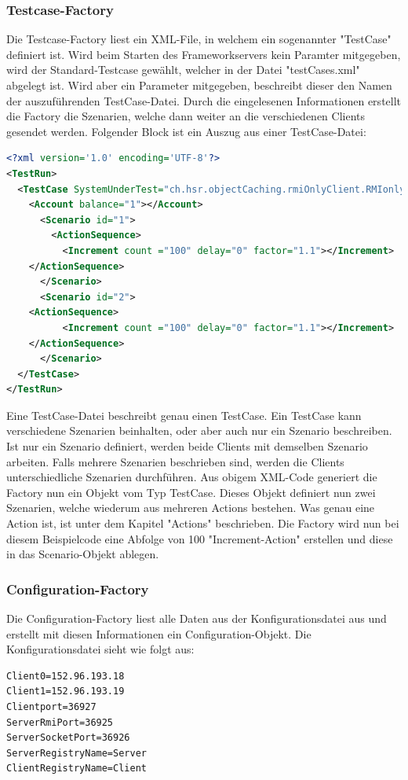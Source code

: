 \subsubsection{Testcase-Factory}
\label{sec:testCaseFactory}
Die Testcase-Factory liest ein XML-File, in welchem ein sogenannter "TestCase" definiert ist. Wird beim Starten des Frameworkservers kein Paramter mitgegeben, wird der Standard-Testcase gewählt, welcher in der Datei "testCases.xml" abgelegt ist. Wird aber ein Parameter mitgegeben, beschreibt dieser den Namen der auszuführenden TestCase-Datei.\newline
Durch die eingelesenen Informationen erstellt die Factory die Szenarien, welche dann weiter an die verschiedenen Clients gesendet werden. Folgender Block ist ein Auszug aus einer TestCase-Datei:

\begin{lstlisting}[language=XML, breaklines=true] 	
<?xml version='1.0' encoding='UTF-8'?>
<TestRun>
  <TestCase SystemUnderTest="ch.hsr.objectCaching.rmiOnlyClient.RMIonlyClientSystem">
    <Account balance="1"></Account>
      <Scenario id="1">
        <ActionSequence>
          <Increment count ="100" delay="0" factor="1.1"></Increment>
	</ActionSequence>
      </Scenario>
      <Scenario id="2">
	<ActionSequence>
          <Increment count ="100" delay="0" factor="1.1"></Increment>
	</ActionSequence>
      </Scenario>
  </TestCase>
</TestRun>
\end{lstlisting}

Eine TestCase-Datei beschreibt genau einen TestCase. Ein TestCase kann verschiedene Szenarien beinhalten, oder aber auch nur ein Szenario beschreiben. Ist nur ein Szenario definiert, werden beide Clients mit demselben Szenario arbeiten. Falls mehrere Szenarien beschrieben sind, werden die Clients unterschiedliche Szenarien durchführen. \newline
Aus obigem XML-Code generiert die Factory nun ein Objekt vom Typ TestCase. Dieses Objekt definiert nun zwei Szenarien, welche wiederum aus mehreren Actions bestehen. Was genau eine Action ist, ist unter dem Kapitel "Actions" beschrieben. Die Factory wird nun bei diesem Beispielcode eine Abfolge von 100 "Increment-Action" erstellen und diese in das Scenario-Objekt ablegen.


\subsubsection{Configuration-Factory}
\label{sec:configurationFactory}
Die Configuration-Factory liest alle Daten aus der Konfigurationsdatei aus und erstellt mit diesen Informationen ein Configuration-Objekt. Die Konfigurationsdatei sieht wie folgt aus:
\begin{lstlisting}
Client0=152.96.193.18
Client1=152.96.193.19
Clientport=36927
ServerRmiPort=36925
ServerSocketPort=36926
ServerRegistryName=Server
ClientRegistryName=Client
\end{lstlisting}

